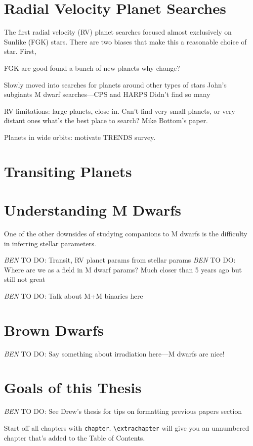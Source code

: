 \documentclass[12pt]{caltech_thesis}
\newcommand{\todo}[3]{{\color{#2} \emph{#1} TO DO: #3}}
\newcommand{\btmtodo}[1]{\todo{BEN}{red}{#1}}
\begin{document}
\section{Radial Velocity Planet Searches}
The first radial velocity (RV) planet searches focused almost exclusively on Sunlike
(FGK) stars. 
There are two biases that make this a reasonable choice of star. 
First, 

FGK are good
found a bunch of new planets
why change?

Slowly moved into searches for planets around other types of stars
John's subgiants
M dwarf searches---CPS and HARPS
Didn't find so many

RV limitations: large planets, close in.
Can't find very small planets, or very distant ones
what's the best place to search? Mike Bottom's paper.

Planets in wide orbits: motivate TRENDS survey.

\section{Transiting Planets}


\section{Understanding M Dwarfs}
One of the other downsides of studying companions to M dwarfs is the difficulty 
in inferring stellar parameters.

\btmtodo{Transit, RV planet params from stellar params}
\btmtodo{Where are we as a field in M dwarf params? Much closer than 5 years ago
but still not great}

\btmtodo{Talk about M+M binaries here}

\section{Brown Dwarfs}
\btmtodo{Say something about irradiation here---M dwarfs are nice!}

\section{Goals of this Thesis} 

\btmtodo{See Drew's thesis for tips on formatting previous papers section}


Start off all chapters with \verb|chapter|.  \verb|\extrachapter| will give you an unnumbered chapter that's added to the Table of Contents. 
\end{document}
